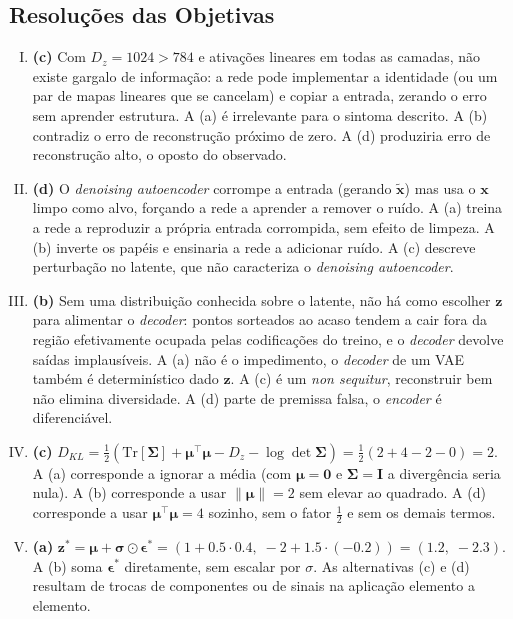 \documentclass{dlproblemset}
\begin{document}
\subsection*{Resoluções das Objetivas}
\color{blue}
\begin{enumerate}[I)]
    \item \textbf{(c)} Com $D_z = 1024 > 784$ e ativações lineares em todas as camadas, não existe gargalo de informação: a rede pode implementar a identidade (ou um par de mapas lineares que se cancelam) e copiar a entrada, zerando o erro sem aprender estrutura. A (a) é irrelevante para o sintoma descrito. A (b) contradiz o erro de reconstrução próximo de zero. A (d) produziria erro de reconstrução alto, o oposto do observado.

    \item \textbf{(d)} O \textit{denoising autoencoder} corrompe a entrada (gerando $\tilde{\mathbf{x}}$) mas usa o $\mathbf{x}$ limpo como alvo, forçando a rede a aprender a remover o ruído. A (a) treina a rede a reproduzir a própria entrada corrompida, sem efeito de limpeza. A (b) inverte os papéis e ensinaria a rede a adicionar ruído. A (c) descreve perturbação no latente, que não caracteriza o \textit{denoising autoencoder}.

    \item \textbf{(b)} Sem uma distribuição conhecida sobre o latente, não há como escolher $\mathbf{z}$ para alimentar o \textit{decoder}: pontos sorteados ao acaso tendem a cair fora da região efetivamente ocupada pelas codificações do treino, e o \textit{decoder} devolve saídas implausíveis. A (a) não é o impedimento, o \textit{decoder} de um VAE também é determinístico dado $\mathbf{z}$. A (c) é um \textit{non sequitur}, reconstruir bem não elimina diversidade. A (d) parte de premissa falsa, o \textit{encoder} é diferenciável.

    \item \textbf{(c)} $D_{KL} = \tfrac{1}{2}\left(\mathrm{Tr}[\boldsymbol{\Sigma}] + \boldsymbol{\mu}^{\top}\boldsymbol{\mu} - D_z - \log\det\boldsymbol{\Sigma}\right) = \tfrac{1}{2}(2 + 4 - 2 - 0) = 2$. A (a) corresponde a ignorar a média (com $\boldsymbol{\mu} = \mathbf{0}$ e $\boldsymbol{\Sigma} = \mathbf{I}$ a divergência seria nula). A (b) corresponde a usar $\|\boldsymbol{\mu}\| = 2$ sem elevar ao quadrado. A (d) corresponde a usar $\boldsymbol{\mu}^{\top}\boldsymbol{\mu} = 4$ sozinho, sem o fator $\tfrac{1}{2}$ e sem os demais termos.

    \item \textbf{(a)} $\mathbf{z}^{*} = \boldsymbol{\mu} + \boldsymbol{\sigma} \odot \boldsymbol{\epsilon}^{*} = (1 + 0.5 \cdot 0.4,\; -2 + 1.5 \cdot (-0.2)) = (1.2,\; -2.3)$. A (b) soma $\boldsymbol{\epsilon}^{*}$ diretamente, sem escalar por $\sigma$. As alternativas (c) e (d) resultam de trocas de componentes ou de sinais na aplicação elemento a elemento.


\end{enumerate}
\end{document}
